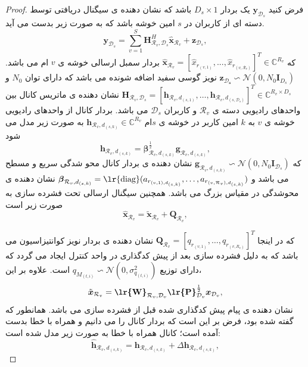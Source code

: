 \begin{proof}
فرض کنید $\boldsymbol{y}_{\mathcal{D}_s}$ یک بردار
 $D_s \times 1$
باشد که نشان دهنده ی سیگنال دریافتی توسط دسته ای از کاربران در $s$
امین خوشه باشد که به صورت زیر بدست می آید.
\begin{equation} \label{1}
\boldsymbol{y}_{\mathcal{D}_s} = \sum_{v=1}^S \boldsymbol{H}^H_{\mathcal{R}_v,\mathcal{D}_s}\hat{\boldsymbol{x}}_{\mathcal{R}_v}+ \boldsymbol{z}_{\mathcal{D}_s},
\end{equation}
که   $\hat{\boldsymbol{x}}_{ \mathcal{R}_v} = [\hat{x}_{ r_{(v,1)}},...,\hat{ x}_{ r_{(v,\mathcal{R}_v)}}]^T \in \mathbb{C}^{{R}_v } $ 
بردار سمبل ارسالی خوشه ی  $v$ ام می باشد.\newline
 $\boldsymbol{z_{\mathcal{D}_s}} \backsim \mathcal{N}(0,N_0\boldsymbol{I}_{{D}_s})$ 
 نویز گوسی سفید اضافه شونده می باشد که دارای توان $N_0$
 و 
 $\boldsymbol{H}_{\mathcal{R}_v,\mathcal{D}_s}=\left[\boldsymbol{h}_{\mathcal{R}_v,d_{(s,1)}},\ldots,\boldsymbol{h}_{\mathcal{R}_v,d_{(s,\mathcal{D}_s)}}\right]^T  \in \mathbb{C}^{{R}_v\times {D}_s}$ 
 نشان دهنده ی ماتریس کانال بین واحدهای رادیویی دسته ی $\mathcal{R}_v$ و کاربران $\mathcal{D}_s$ می باشد.
 بردار کانال از واحدهای رادیویی خوشه ی  $v$ به $k$ امین کاربر در خوشه ی $s$ام  
 $\boldsymbol{h}_{\mathcal{R}_v,d_{(s,k)}}\in \mathbb{C}^{{R}_v}$
 به صورت زیر مدل می شود \cite{cellfree}
 \begin{equation}\label{channel}
\boldsymbol{h}_{\mathcal{R}_v,d_{(s,k)}} = \boldsymbol{\beta}^\frac{1}{2}_{\mathcal{R}_v,d_{(s,k)}} \boldsymbol{g}_{\mathcal{R}_v,d_{(s,k)}},
\end{equation}
که  $\boldsymbol{g}_{\mathcal{R}_v,d_{(s,k)}} \backsim \mathcal{N}(0,N_0\boldsymbol{I}_{\mathcal{D}_s})$ نشان دهنده ی بردار کانال محو شدگی سریع و مسطح می باشد 
و $\boldsymbol{\beta}_{\mathcal{R}_v,d_{(s,k)}}=\text{\lr{diag}}(a_{r_{(v,1),d_{(s,k)}}},\ldots,a_{r_{(v,\mathcal{R}_v),d_{(s,k)}}})$
نشان دهنده ی محوشدگی  در مقیاس بزرگ می باشد. همچنین سیگنال ارسالی تحت فشرده سازی به صورت زیر است
\begin{equation}
\label{eq_pow1}
 \hat{\boldsymbol{x}}_{\mathcal{R}_v} = \tilde{\boldsymbol{x}}_{\mathcal{R}_v} + \boldsymbol{Q}_{\mathcal{R}_v},
\end{equation}

که در اینجا $\boldsymbol{Q}_{\mathcal{R}_v} = \left[ q_{r_{(v,1)}},\ldots,q_{r_{(v,R_v)}}\right]^T$ نشان دهنده ی بردار نویز کوانتیزاسیون می باشد که به دلیل فشرده سازی بعد از پیش کدگذاری در واحد کنترل ایجاد می گردد که دارای توزیع $q_{M_{(t,i)}}\backsim \mathcal{N}(0,\sigma_{q_{(t,i)}}^2) $ است.
علاوه بر این،  
$$\tilde{\boldsymbol{x}}_{\mathcal{R}_v} = \textbf{\lr{W}}_{\mathcal{R}_v,\mathcal{D}_v} \textbf{\lr{P}}_{\mathcal{D}_v}^{\frac{1}{2}} \boldsymbol{x}_{ \mathcal{D}_v},$$
نشان دهنده ی پیام پیش کدگذاری شده قبل از فشرده سازی می باشد.
همانطور که گفته شده بود، فرض بر این است که بردار کانال را می دانیم و همراه با خطا بدست آمده است؛ کانال همراه با خطا به صورت زیر مدل شده است: 
\begin{equation*}
\hat{\boldsymbol{h}}_{\mathcal{R}_v,d_{(s,k)}} = \boldsymbol{h}_{\mathcal{R}_v,d_{(s,k)}} + \Delta \boldsymbol{h}_{\mathcal{R}_v,d_{(s,k)}},
\end{equation*}


\end{proof}
